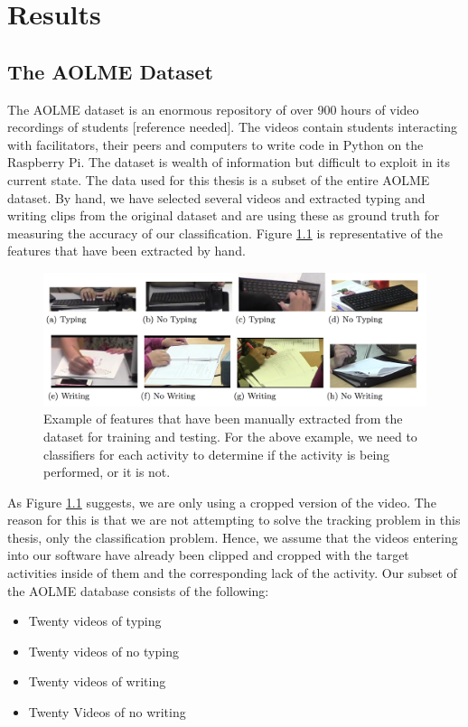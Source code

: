 \chapter{Results}
\section{\label{section:the_data}The AOLME Dataset}
The AOLME dataset is an enormous repository of over 900 hours of video
recordings of students [reference needed]. The videos contain students
interacting with facilitators, their peers and computers to write code in
Python on the Raspberry Pi.  The dataset is wealth of information but difficult
to exploit in its current state.  The data used for this thesis is a subset of
the entire AOLME dataset. By hand, we have selected several videos and extracted
typing and writing clips from the original dataset and are using these as ground
truth for measuring the accuracy of our classification. Figure \ref{fig:typing_writing}
is representative of the features that have been extracted by hand.

\begin{figure}[h]
  \label{fig:typing_writing}
  \centering
  \includegraphics[width=\textwidth]{figures/typing_writing_clip}
  \caption{Example of features that have been manually extracted from the dataset
  for training and testing. For the above example, we need to classifiers for each
  activity to determine if the activity is being performed, or it is not.}
\end{figure}

As Figure \ref{fig:typing_writing} suggests, we are only using a cropped version
of the video. The reason for this is that we are not attempting to solve the tracking
problem in this thesis, only the classification problem. Hence, we assume that
the videos entering into our software have already been clipped and cropped with
the target activities inside of them and the corresponding lack of the activity.
Our subset of the AOLME database consists of the following:

\begin{itemize}
\item Twenty videos of typing
\item Twenty videos of no typing
\item Twenty videos of writing
\item Twenty Videos of no writing
\end{itemize}

